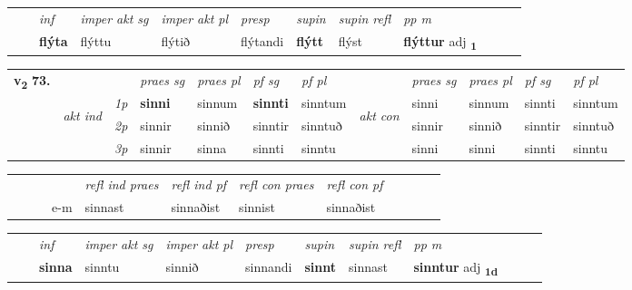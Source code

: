 \begin{tabular}{llllllllllll}
 & & \textit{inf} & \textit{imper akt sg} & \textit{imper akt pl}   & \textit{presp} & \textit{supin} & \textit{supin refl} & \textit{pp m}     \\*
  & & \textbf{flýta} & flýttu  & flýtið   & flýtandi &  \textbf{flýtt} & flýst & \textbf{flýttur} adj \textbf{\textsubscript{1}} \\*
\cmidrule{1-12}
\end{tabular}



\begin{tabular}{llllllllllll} \toprule
\multirow{4}{*}{{{\textbf{v{\textsubscript{2}}} \Large{\textbf{73.}}}}}  & &   &  \textit{praes sg}  & \textit{praes pl}  &\textit{ pf sg} & \textit{pf pl} &  &  \textit{praes sg}  & \textit{praes pl}  & \textit{pf sg} & \textit{pf pl } \\*
	\cmidrule{4-7} \cmidrule{9-12}
 & \multirow{3}{*}{\begin{turn}{90}\textit{akt ind}\end{turn}} & {\textit{1p}} & \textbf{sinni} & sinnum    & \textbf{sinnti} & sinntum & \multirow{3}{*}{\begin{turn}{90}\textit{akt con}\end{turn}} &sinni & sinnum & sinnti & sinntum\\*
& &  {\textit{2p}} &  sinnir  & sinnið   & sinntir & sinntuð & & sinnir & sinnið & sinntir & sinntuð \\*
& &  {\textit{3p}} & sinnir & sinna   & sinnti & sinntu & & sinni & sinni& sinnti & sinntu  \\*
\cmidrule{4-7} \cmidrule{9-12}
\end{tabular}


\begin{tabular}{llllllllllll}
 & &  & &  \textit{refl ind praes} & \textit{refl ind pf} & \textit{refl con praes} & \textit{refl con pf} \\*
&  & & e-m & sinnast & sinnaðist & sinnist & sinnaðist \\*
\cmidrule{5-9}
\end{tabular}


\begin{tabular}{llllllllllll}
 & & \textit{inf} & \textit{imper akt sg} & \textit{imper akt pl}   & \textit{presp} & \textit{supin} & \textit{supin refl} & \textit{pp m}     \\*
  & & \textbf{sinna} & sinntu  & sinnið   & sinnandi &  \textbf{sinnt} & sinnast & \textbf{sinntur} adj \textbf{\textsubscript{1d}} \\*
\cmidrule{1-12}
\end{tabular}



